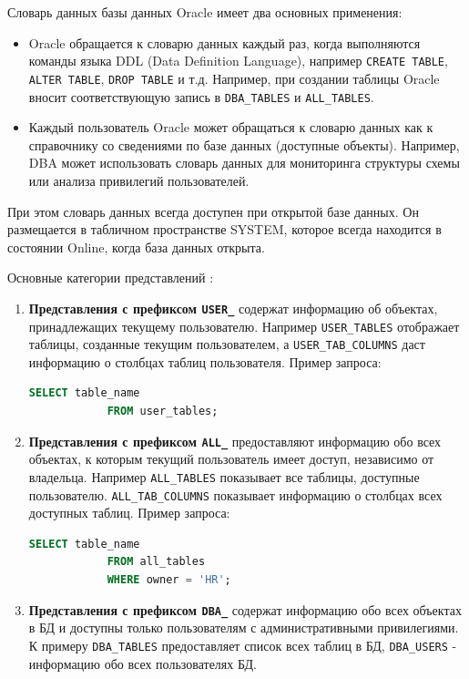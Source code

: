 \begin{enumerate}
    Словарь данных базы данных Oracle имеет два основных применения:
    \begin{itemize}
        \item Oracle обращается к словарю данных каждый раз, когда выполняются команды языка DDL (Data Definition Language), например \texttt{CREATE TABLE}, \texttt{ALTER TABLE}, \texttt{DROP TABLE} и т.д. Например, при создании таблицы Oracle вносит соответствующую запись в \texttt{DBA\_TABLES} и \texttt{ALL\_TABLES}.
        \item Каждый пользователь Oracle может обращаться к словарю данных как к справочнику со сведениями по базе данных (доступные объекты). Например, DBA может использовать словарь данных для мониторинга структуры схемы или анализа привилегий пользователей.
    \end{itemize}

    При этом словарь данных всегда доступен при открытой базе данных. Он размещается в табличном пространстве SYSTEM, которое всегда находится в состоянии Online, когда база данных открыта.

    Основные категории представлений \autocite{oracledbdoc1}:
    \begin{enumerate}

        \item \textbf{Представления с префиксом \texttt{USER\_}} содержат информацию об объектах, принадлежащих текущему пользователю. Например \texttt{USER\_TABLES} отображает таблицы, созданные текущим пользователем, а \texttt{USER\_TAB\_COLUMNS} даст информацию о столбцах таблиц пользователя.
        Пример запроса:
        \begin{lstlisting}[language=SQL]
            SELECT table_name 
            FROM user_tables;
        \end{lstlisting}

        \item \textbf{Представления с префиксом \texttt{ALL\_}} предоставляют информацию обо всех объектах, к которым текущий пользователь имеет доступ, независимо от владельца. Например \texttt{ALL\_TABLES} показывает все таблицы, доступные пользователю. \texttt{ALL\_TAB\_COLUMNS} показывает информацию о столбцах всех доступных таблиц.
        Пример запроса:
        \begin{lstlisting}[language=SQL]
            SELECT table_name 
            FROM all_tables 
            WHERE owner = 'HR';
        \end{lstlisting}

        \item \textbf{Представления с префиксом \texttt{DBA\_}} содержат информацию обо всех объектах в БД и доступны только пользователям с административными привилегиями. К примеру \texttt{DBA\_TABLES} предоставляет список всех таблиц в БД, \texttt{DBA\_USERS} - информацию обо всех пользователях БД.
        

\end{enumerate}
\end{enumerate}
